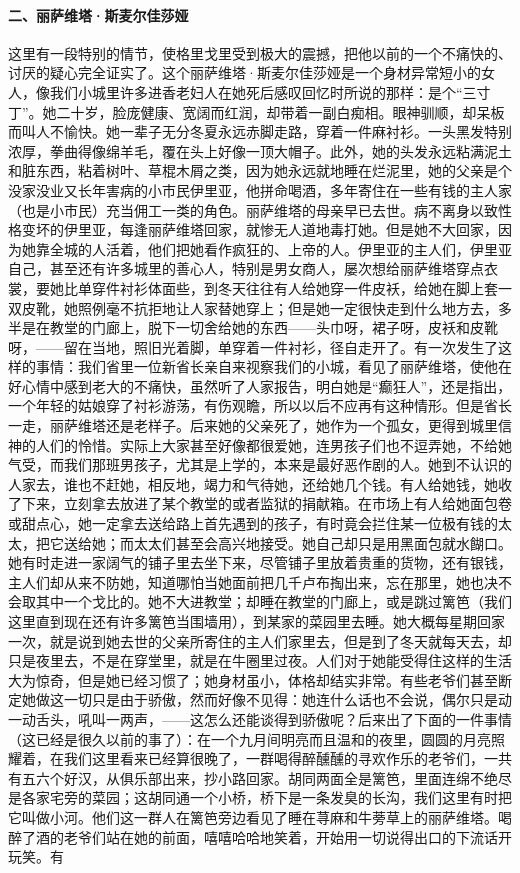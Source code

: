 \paragraph*{二、丽萨维塔·斯麦尔佳莎娅}
\par 这里有一段特别的情节，使格里戈里受到极大的震撼，把他以前的一个不痛快的、讨厌的疑心完全证实了。这个丽萨维塔·斯麦尔佳莎娅是一个身材异常短小的女人，像我们小城里许多进香老妇人在她死后感叹回忆时所说的那样：是个“三寸丁”。她二十岁，脸庞健康、宽阔而红润，却带着一副白痴相。眼神驯顺，却呆板而叫人不愉快。她一辈子无分冬夏永远赤脚走路，穿着一件麻衬衫。一头黑发特别浓厚，拳曲得像绵羊毛，覆在头上好像一顶大帽子。此外，她的头发永远粘满泥土和脏东西，粘着树叶、草棍木屑之类，因为她永远就地睡在烂泥里，她的父亲是个没家没业又长年害病的小市民伊里亚，他拼命喝酒，多年寄住在一些有钱的主人家（也是小市民）充当佣工一类的角色。丽萨维塔的母亲早已去世。病不离身以致性格变坏的伊里亚，每逢丽萨维塔回家，就惨无人道地毒打她。但是她不大回家，因为她靠全城的人活着，他们把她看作疯狂的、上帝的人。伊里亚的主人们，伊里亚自己，甚至还有许多城里的善心人，特别是男女商人，屡次想给丽萨维塔穿点衣裳，要她比单穿件衬衫体面些，到冬天往往有人给她穿一件皮袄，给她在脚上套一双皮靴，她照例毫不抗拒地让人家替她穿上；但是她一定很快走到什么地方去，多半是在教堂的门廊上，脱下一切舍给她的东西——头巾呀，裙子呀，皮袄和皮靴呀，——留在当地，照旧光着脚，单穿着一件衬衫，径自走开了。有一次发生了这样的事情：我们省里一位新省长亲自来视察我们的小城，看见了丽萨维塔，使他在好心情中感到老大的不痛快，虽然听了人家报告，明白她是“癫狂人”，还是指出，一个年轻的姑娘穿了衬衫游荡，有伤观瞻，所以以后不应再有这种情形。但是省长一走，丽萨维塔还是老样子。后来她的父亲死了，她作为一个孤女，更得到城里信神的人们的怜惜。实际上大家甚至好像都很爱她，连男孩子们也不逗弄她，不给她气受，而我们那班男孩子，尤其是上学的，本来是最好恶作剧的人。她到不认识的人家去，谁也不赶她，相反地，竭力和气待她，还给她几个钱。有人给她钱，她收了下来，立刻拿去放进了某个教堂的或者监狱的捐献箱。在市场上有人给她面包卷或甜点心，她一定拿去送给路上首先遇到的孩子，有时竟会拦住某一位极有钱的太太，把它送给她；而太太们甚至会高兴地接受。她自己却只是用黑面包就水餬口。她有时走进一家阔气的铺子里去坐下来，尽管铺子里放着贵重的货物，还有银钱，主人们却从来不防她，知道哪怕当她面前把几千卢布掏出来，忘在那里，她也决不会取其中一个戈比的。她不大进教堂；却睡在教堂的门廊上，或是跳过篱笆（我们这里直到现在还有许多篱笆当围墙用），到某家的菜园里去睡。她大概每星期回家一次，就是说到她去世的父亲所寄住的主人们家里去，但是到了冬天就每天去，却只是夜里去，不是在穿堂里，就是在牛圈里过夜。人们对于她能受得住这样的生活大为惊奇，但是她已经习惯了；她身材虽小，体格却结实非常。有些老爷们甚至断定她做这一切只是由于骄傲，然而好像不见得：她连什么话也不会说，偶尔只是动一动舌头，吼叫一两声，——这怎么还能谈得到骄傲呢？后来出了下面的一件事情（这已经是很久以前的事了）：在一个九月间明亮而且温和的夜里，圆圆的月亮照耀着，在我们这里看来已经算很晚了，一群喝得醉醺醺的寻欢作乐的老爷们，一共有五六个好汉，从俱乐部出来，抄小路回家。胡同两面全是篱笆，里面连绵不绝尽是各家宅旁的菜园；这胡同通一个小桥，桥下是一条发臭的长沟，我们这里有时把它叫做小河。他们这一群人在篱笆旁边看见了睡在荨麻和牛蒡草上的丽萨维塔。喝醉了酒的老爷们站在她的前面，嘻嘻哈哈地笑着，开始用一切说得出口的下流话开玩笑。有